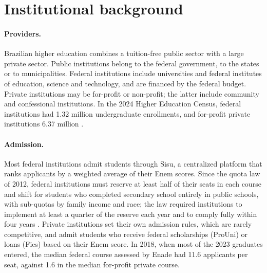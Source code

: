 \documentclass[12pt,letterpaper]{article}
\begin{document}
\section{Institutional background}\label{sec:background}

\paragraph{Providers.} Brazilian higher education combines a tuition-free public sector with a large private sector. Public institutions belong to the federal government, to the states or to municipalities. Federal institutions include universities and federal institutes of education, science and technology, and are financed by the federal budget. Private institutions may be for-profit or non-profit; the latter include community and confessional institutions. In the 2024 Higher Education Census, federal institutions had 1.32 million undergraduate enrollments, and for-profit private institutions 6.37 million \citep{inepcenso}.

\paragraph{Admission.} Most federal institutions admit students through Sisu, a centralized platform that ranks applicants by a weighted average of their Enem scores. Since the quota law of 2012, federal institutions must reserve at least half of their seats in each course and shift for students who completed secondary school entirely in public schools, with sub-quotas by family income and race; the law required institutions to implement at least a quarter of the reserve each year and to comply fully within four years \citep[arts.~1 and~8]{lei12711}. Private institutions set their own admission rules, which are rarely competitive, and admit students who receive federal scholarships (ProUni) or loans (Fies) based on their Enem score. In 2018, when most of the 2023 graduates entered, the median federal course assessed by Enade had 11.6 applicants per seat, against 1.6 in the median for-profit private course.
\end{document}

